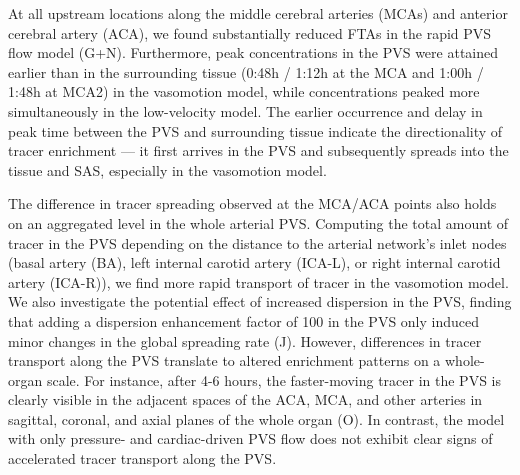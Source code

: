 \documentclass[fleqn,10pt]{wlscirep}
\begin{document}
At all upstream locations along the middle cerebral arteries (MCAs) and anterior cerebral artery (ACA), we found substantially reduced FTAs in the rapid PVS flow model (G+N). Furthermore, peak concentrations in the PVS were attained earlier than in the surrounding tissue (0:48h / 1:12h at the MCA and 1:00h / 1:48h at MCA2) in the vasomotion model, while concentrations peaked more simultaneously in the low-velocity model. The earlier occurrence and delay in peak time between the PVS and surrounding tissue indicate the directionality of tracer enrichment — it first arrives in the PVS and subsequently spreads into the tissue and SAS, especially in the vasomotion model.

The difference in tracer spreading observed at the MCA/ACA points also holds on an aggregated level in the whole arterial PVS. Computing the total amount of tracer in the PVS depending on the distance to the arterial network's inlet nodes (basal artery (BA), left internal carotid artery (ICA-L), or right internal carotid artery (ICA-R)), we find more rapid transport of tracer in the vasomotion model. We also investigate the potential effect of increased dispersion in the PVS, finding that adding a dispersion enhancement factor of 100 in the PVS only induced minor changes in the global spreading rate (J). However, differences in tracer transport along the PVS translate to altered enrichment patterns on a whole-organ scale. For instance, after 4-6 hours, the faster-moving tracer in the PVS is clearly visible in the adjacent spaces of the ACA, MCA, and other arteries in sagittal, coronal, and axial planes of the whole organ (O). In contrast, the model with only pressure- and cardiac-driven PVS flow does not exhibit clear signs of accelerated tracer transport along the PVS.
\end{document}
